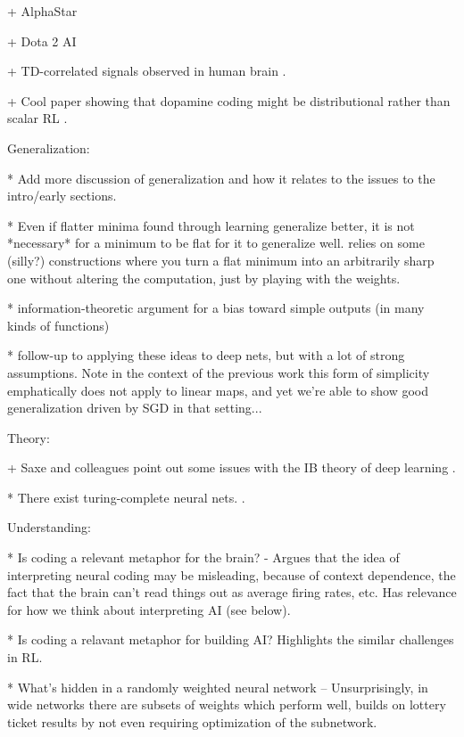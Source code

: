 + AlphaStar \citep{Vinyals2019}

+ Dota 2 AI \citep{OpenAI2019}

+ TD-correlated signals observed in human brain \citep{ODoherty2003}.

+ Cool paper showing that dopamine coding might be distributional rather than scalar RL \citep{Dabney2020}.


Generalization:

* Add more discussion of generalization and how it relates to the issues to the intro/early sections.

* Even if flatter minima found through learning generalize better, it is not *necessary* for a minimum to be flat for it to generalize well. relies on some (silly?) constructions where you turn a flat minimum into an arbitrarily sharp one without altering the computation, just by playing with the weights. \citep{Dinh2017} 

* information-theoretic argument for a bias toward simple outputs (in many kinds of functions) \citep{Dingle2018}

* follow-up to \citep{Dingle2018} applying these ideas to deep nets, but with a lot of strong assumptions. \citep{Perez2019} Note in the context of the previous work this form of simplicity emphatically does not apply to linear maps, and yet we're able to show good generalization driven by SGD in that setting...  


Theory:

+ Saxe and colleagues point out some issues with the IB theory of deep learning \citep{Saxe2018a}.

* There exist turing-complete neural nets. \citep{Siegelman1992}.


Understanding:

* Is coding a relevant metaphor for the brain? - Argues that the idea of interpreting neural coding may be misleading, because of context dependence, the fact that the brain can't read things out as average firing rates, etc. Has relevance for how we think about interpreting AI (see below). \citep{Brette2019} 

* Is coding a relavant metaphor for building AI? Highlights the similar challenges in RL. \citep{Santoro2019}

* What's hidden in a randomly weighted neural network -- Unsurprisingly, in wide networks there are subsets of weights which perform well, builds on lottery ticket results by not even requiring optimization of the subnetwork. \citep{Ramanujan2019}

